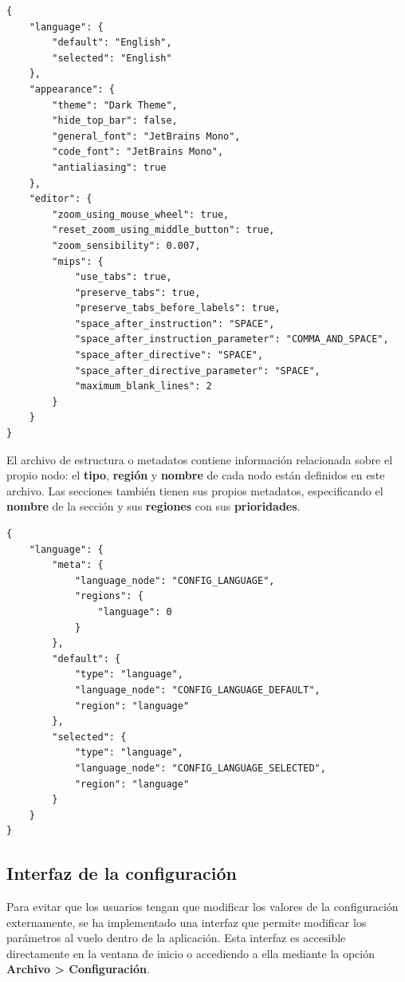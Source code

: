 \begin{lstlisting}[frame=single,label={lst:main_config.json}]
{
    "language": {
        "default": "English",
        "selected": "English"
    },
    "appearance": {
        "theme": "Dark Theme",
        "hide_top_bar": false,
        "general_font": "JetBrains Mono",
        "code_font": "JetBrains Mono",
        "antialiasing": true
    },
    "editor": {
        "zoom_using_mouse_wheel": true,
        "reset_zoom_using_middle_button": true,
        "zoom_sensibility": 0.007,
        "mips": {
            "use_tabs": true,
            "preserve_tabs": true,
            "preserve_tabs_before_labels": true,
            "space_after_instruction": "SPACE",
            "space_after_instruction_parameter": "COMMA_AND_SPACE",
            "space_after_directive": "SPACE",
            "space_after_directive_parameter": "SPACE",
            "maximum_blank_lines": 2
        }
    }
}
\end{lstlisting}

\noindent El archivo de estructura o metadatos contiene información
relacionada sobre el propio nodo: el \textbf{tipo}, \textbf{región}
y \textbf{nombre} de cada nodo están definidos en este archivo.
Las secciones también tienen sus propios metadatos, especificando
el \textbf{nombre} de la sección y sus \textbf{regiones} con sus
\textbf{prioridades}.

\begin{lstlisting}[frame=single,label={lst:main_config_meta.json}]
{
    "language": {
        "meta": {
            "language_node": "CONFIG_LANGUAGE",
            "regions": {
                "language": 0
            }
        },
        "default": {
            "type": "language",
            "language_node": "CONFIG_LANGUAGE_DEFAULT",
            "region": "language"
        },
        "selected": {
            "type": "language",
            "language_node": "CONFIG_LANGUAGE_SELECTED",
            "region": "language"
        }
    }
}
\end{lstlisting}

\subsection{Interfaz de la configuración}\label{subsec:interfaz-de-la-configuración}

Para evitar que los usuarios tengan que modificar los valores de la configuración
externamente, se ha implementado una interfaz que permite modificar los
parámetros al vuelo dentro de la aplicación.
Esta interfaz es accesible directamente en la ventana de inicio o accediendo a ella
mediante la opción \textbf{Archivo > Configuración}.

